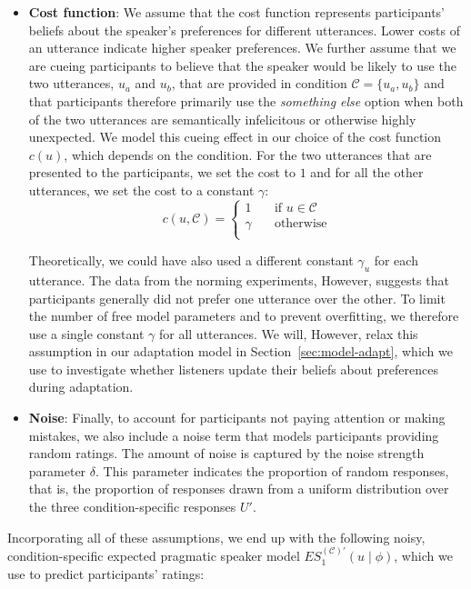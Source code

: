 \documentclass[lucida,biblatex]{sp} %
\newcommand{\sectionref}[1]{Section~\ref{#1}}
\begin{document}
\begin{itemize}
\item \textbf{Cost function}: We assume that the cost function represents participants' beliefs about the speaker's 
preferences for different utterances. Lower costs of an utterance indicate higher speaker preferences. We further 
assume that we are cueing participants to believe that the speaker would be likely to use the two utterances, $u_a$ 
and $u_b$, that are provided in condition $\mathscr{C}=\{u_a, u_b\}$ and that participants therefore primarily use the 
\textit{something else} option when both of the two utterances are semantically infelicitous or otherwise highly unexpected. 
We model this cueing effect in our choice of the cost function $c(u)$, which depends on the condition. For the two utterances 
that are presented to the participants, we set the cost to $1$ and for all the other utterances, we set the cost to a constant $\gamma$:
$$
c(u, \mathscr{C}) = 
     \begin{cases}
       1 &\quad\text{if } u  \in \mathscr{C}\\
       \gamma &\quad\text{otherwise} \\
     \end{cases}
$$

Theoretically, we could have also used a different constant $\gamma_u$ for each utterance. The data from
the norming experiments, However, suggests that participants generally did not prefer one utterance over 
the other. To limit the number of free model parameters and to prevent overfitting, we therefore use a single
constant $\gamma$ for all utterances. We will, However, relax this assumption in our adaptation model in \sectionref{sec:model-adapt}, which
we use to investigate whether listeners update their beliefs about preferences during adaptation.

\item \textbf{Noise}: Finally, to account for participants not paying attention or making mistakes, 
we also include a noise term that models participants providing random ratings.
The amount of noise is captured by the noise strength parameter $\delta$. This parameter
indicates the proportion of random responses, that is, the proportion of responses drawn from a uniform distribution
over the three condition-specific responses $U'$. 

\end{itemize}

\noindent Incorporating all of these assumptions, we end up with the following noisy, condition-specific expected pragmatic speaker 
model $ES_1^{(\mathscr{C})'}(u \mid \phi)$, which we use to predict participants' ratings:
\end{document}
